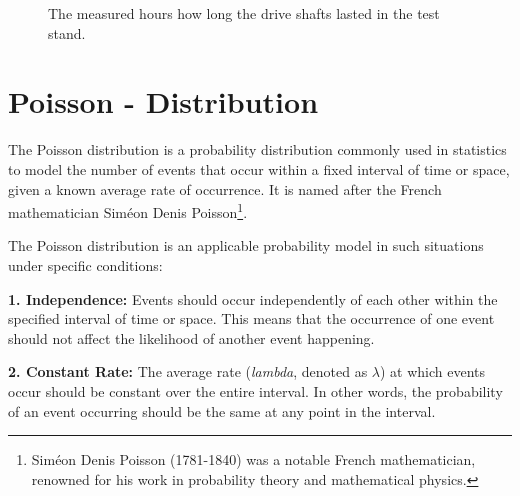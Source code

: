 \documentclass[
  a4paper,
]{scrbook}
\begin{document}
\begin{figure}[ht]


\caption{\label{fig-ds-wbll}The measured hours how long the drive shafts
lasted in the test stand.}

\end{figure}%

\section{Poisson - Distribution}\label{poisson---distribution}

The Poisson distribution is a probability distribution commonly used in
statistics to model the number of events that occur within a fixed
interval of time or space, given a known average rate of occurrence. It
is named after the French mathematician Siméon Denis Poisson\footnote{Siméon
  Denis Poisson (1781-1840) was a notable French mathematician, renowned
  for his work in probability theory and mathematical physics.}.

The Poisson distribution is an applicable probability model in such
situations under specific conditions:

\textbf{1. Independence:} Events should occur independently of each
other within the specified interval of time or space. This means that
the occurrence of one event should not affect the likelihood of another
event happening.

\textbf{2. Constant Rate:} The average rate (\emph{lambda}, denoted as
\(\lambda\)) at which events occur should be constant over the entire
interval. In other words, the probability of an event occurring should
be the same at any point in the interval.
\end{document}
